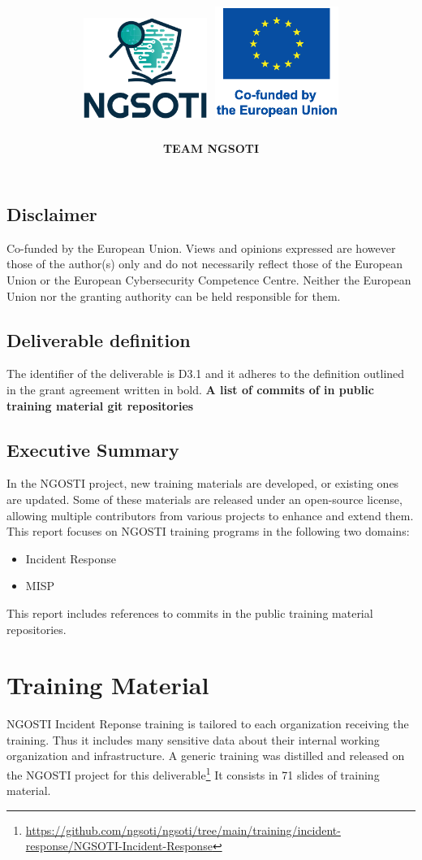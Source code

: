 \documentclass[10pt,a4paper]{report}
\title{
    \Huge \textbf{\delivtitle} \\[0.5cm]
    \includegraphics[width=0.3\textwidth]{img/ngsoti.eps}
    \hspace{1cm}
    \includegraphics[width=0.3\textwidth]{img/eu_funded_en.eps}
}
\author{\textbf{TEAM NGSOTI}}
\date{\delivdate}
\begin{document}
\maketitle
\thispagestyle{empty} %

\newpage
\tableofcontents
\newpage
\section*{Disclaimer}
Co-funded by the European Union. Views and opinions expressed are however those of the author(s) only
and do not necessarily reflect those of the European Union or the European Cybersecurity Competence Centre. Neither
the European Union nor the granting authority can be held responsible for them.

\section*{Deliverable definition}
The identifier of the deliverable is D3.1 and it adheres to the definition outlined in the grant agreement
written in bold. \textbf{A list of commits of in public training material git repositories}

\section*{Executive Summary}
In the NGOSTI project, new training materials are developed, or existing ones
are updated. Some of these materials are released under an open-source license,
allowing multiple contributors from various projects to enhance and extend them.
This report focuses on NGOSTI training programs in the following two domains:

\begin{itemize}
    \item Incident Response
    \item MISP
\end{itemize}

This report includes references to commits in the public training material
repositories.

\chapter{Training Material}

NGOSTI Incident Reponse training is tailored to each organization receiving the
training. Thus it includes many sensitive data about their internal working
organization and infrastructure.
A generic training was distilled and released on the NGOSTI project for this
deliverable\footnote{\url{https://github.com/ngsoti/ngsoti/tree/main/training/incident-response/NGSOTI-Incident-Response}}
It consists in 71 slides of training material.
\end{document}

